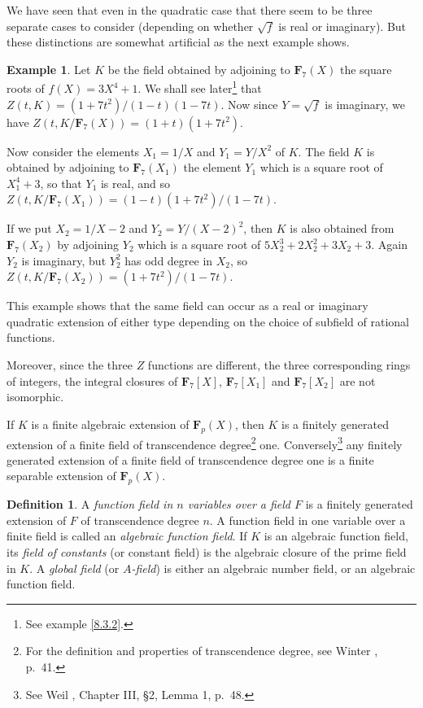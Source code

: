 \documentclass[10pt]{article}
\theoremstyle{definition}
\newtheorem{defi}[theo]{Definition}
\newtheorem{exam}[theo]{Example}
\def\FF{\mathbf{F}}
\def\fnthth{See example \ref{8.3.2}.}
\def\fnthfo{For the definition and properties of transcendence degree, see Winter \cite{bib:217}, p.~41.}
\def\fnthfi{See Weil \cite{bib:214}, Chapter III, \S2, Lemma 1, p.~48.}
\begin{document}
We have seen that even in the quadratic case that there seem to be three separate cases to consider (depending on whether $\sqrt f$ is real or imaginary).
But these distinctions are somewhat artificial as the next example shows.


\begin{exam}
\label{3.5.6}
Let $K$ be the field obtained by adjoining to $\FF_7(X)$ the square roots of $f(X) = 3X^4 + 1$.
We shall see later\footnote{\fnthth} that $Z(t,K) = (1+7t^2)/(1-t)(1-7t)$.
Now since $Y = \sqrt f$ is imaginary, we have $Z(t,K/\FF_7(X)) = (1+t)(1+7t^2)$.

Now consider the elements $X_1 = 1/X$ and $Y_1 = Y/X^2$ of $K$.
The field $K$ is obtained by adjoining to $\FF_7(X_1)$ the element $Y_1$ which is a square root of $X_1^4 + 3$, so that $Y_1$ is real, and so $Z(t, K/\FF_7(X_1)) = (1-t)(1+7t^2)/(1-7t)$.

If we put $X_2 = 1/X-2$ and $Y_2 = Y/(X-2)^2$, then $K$ is also obtained from $\FF_7(X_2)$ by adjoining $Y_2$ which is a square root of $5X_2^3 + 2X_2^2 + 3X_2 + 3$.
Again $Y_2$ is imaginary, but $Y_2^2$ has odd degree in $X_2$, so $Z(t, K/\FF_7(X_2)) = (1+7t^2)/(1-7t)$.

This example shows that the same field can occur as a real or imaginary quadratic extension of either type depending on the choice of subfield of rational functions.

Moreover, since the three $Z$ functions are different, the three corresponding rings of integers, the integral closures of $\FF_7[X]$, $\FF_7[X_1]$ and $\FF_7[X_2]$ are not isomorphic.
\end{exam}

If $K$ is a finite algebraic extension of $\FF_p(X)$, then $K$ is a finitely generated extension of a finite field of transcendence degree\footnote{\fnthfo} one.
Conversely\footnote{\fnthfi} any finitely generated extension of a finite field of transcendence degree one is a finite separable extension of $\FF_p(X)$.


\begin{defi}
\label{3.5.7}
A \emph{function field in $n$ variables over a field $F$} is a finitely generated extension of $F$ of transcendence degree $n$.
A function field in one variable over a finite field is called an \emph{algebraic function field}.
If $K$ is an algebraic function field, its \emph{field of constants} (or constant field) is the algebraic closure of the prime field in $K$.
A \emph{global field} (or \emph{$A$-field}) is either an algebraic number field, or an algebraic function field.
\end{defi}
\end{document}
